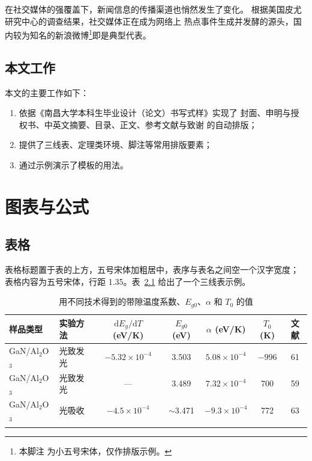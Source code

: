 \documentclass{ncubachelor}
\begin{document}
在社交媒体的强覆盖下，新闻信息的传播渠道也悄然发生了变化。
根据美国皮尤研究中心的调查结果\cite{pew}，社交媒体正在成为网络上
热点事件生成并发酵的源头，国内较为知名的新浪微博\footnote{本脚注
为小五号宋体，仅作排版示例。}即是典型代表。

\section{本文工作}

本文的主要工作如下：
\begin{enumerate}
  \item 依据《南昌大学本科生毕业设计（论文）书写式样》实现了
        封面、申明与授权书、中英文摘要、目录、正文、参考文献与致谢
        的自动排版；
  \item 提供了三线表、定理类环境、脚注等常用排版要素；
  \item 通过示例演示了模板的用法。
\end{enumerate}

\chapter{图表与公式}\label{chap:figtab}

\section{表格}

表格标题置于表的上方，五号宋体加粗居中，表序与表名之间空一个汉字宽度；
表格内容为五号宋体，行距 1.35。表~\ref{tab:demo} 给出了一个三线表示例。

\begin{table}[htb]
  \centering
  \caption{用不同技术得到的带隙温度系数、$E_{g0}$、$\alpha$ 和 $T_0$ 的值}
  \label{tab:demo}
  \begin{tabular}{llccccc}
    \thickhline
    样品类型 & 实验方法 & $\mathrm{d}E_g/\mathrm{d}T$ (eV/K) &
    $E_{g0}$(eV) & $\alpha$ (eV/K) & $T_0$(K) & 文献 \\
    \hline
    GaN/Al$_2$O$_3$ & 光致发光 & $-5.32\times 10^{-4}$ & 3.503 &
    $5.08\times 10^{-4}$ & $-996$ & 61 \\
    GaN/Al$_2$O$_3$ & 光致发光 & —                      & 3.489 &
    $7.32\times 10^{-4}$ & 700   & 59 \\
    GaN/Al$_2$O$_3$ & 光吸收   & $-4.5\times 10^{-4}$   & $\sim$3.471 &
    $-9.3\times 10^{-4}$ & 772   & 63 \\
    \thickhline
  \end{tabular}
\end{table}
\end{document}
